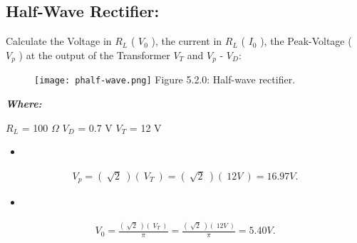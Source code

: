 \subsection{Half-Wave Rectifier:}

Calculate the Voltage in $R_{L}$ ( $V_{0}$ ), the current in $R_{L}$ ( $I_{0}$ ), the Peak-Voltage ( $V_{p}$ ) at the output of the Transformer $V_{T}$ and $V_{p}$ - $V_{D}$:

\begin{figure}[H]
\texttt{[image: phalf-wave.png]}
\centering \linebreak \linebreak Figure 5.2.0: Half-wave rectifier.
\end{figure}

{\bfseries\itshape Where:
\begin{tasks}
\task $R_{L}$ = 100 $\Omega$
\task $V_{D}$ = 0.7 V
\task $V_{T}$ = 12 V
\end{tasks}} \hfill

{\bfseries\itshape\color{Maroon}{Solution:}} \hfill \break

\begin{itemize}
\item {\bfseries\itshape\color{Violet}{For peak voltage at the transformer output:}} \hfill \break
{\bfseries\itshape{}}
\end{itemize}

\begin{ceqn}
\begin{align}
V_{p} = (\ \sqrt{2}\ )(\ V_{T}\ ) = (\ \sqrt{2}\ )(\ 12 V\ ) = 16.97 V.
\end{align}
\end{ceqn}

\begin{itemize}
\item {\bfseries\itshape{}} \hfill \break
{\bfseries\itshape{}}
\end{itemize}

\begin{ceqn}
\begin{align}
V_{0} = \frac{(\ \sqrt{2}\ )(\ V_{T}\ )}{\pi} = \frac{(\ \sqrt{2}\ )(\ 12 V\ )}{\pi} = 5.40 V.
\end{align}
\end{ceqn}

